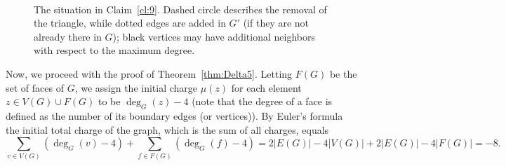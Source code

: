 \documentclass[11pt]{article}
\begin{document}
\begin{figure}[ht!]
\begin{center}
 \\
	\caption{The situation in Claim~\ref{cl:9}. Dashed circle describes the removal of the triangle, while dotted edges are added in $G'$ (if they are not already there in $G$); black vertices may have additional neighbors with respect to the maximum degree.}\label{fig:cl:9}
\end{center}
\end{figure}





Now, we proceed with the proof of Theorem~\ref{thm:Delta5}. Letting $F(G)$ be the set of faces of $G$, we assign the initial charge $\mu(z)$ for each element $z\in V(G)\cup F(G)$ to be $\deg_G(z)-4$ (note that the degree of a face is defined as the number of its boundary edges (or vertices)). By Euler's formula the initial total charge of the graph, which is the sum of all charges, equals
$$\sum_{v\in V(G)}{(\deg_G(v)-4)}+\sum_{f\in F(G)}{(\deg_G(f)-4)}=2|E(G)|-4|V(G)|+2|E(G)|-4|F(G)|=-8.$$
\end{document}
